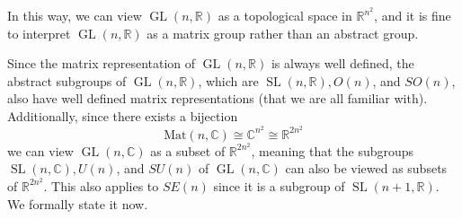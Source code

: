 \documentclass{article}
\DeclareMathOperator{\GL}{GL}
\DeclareMathOperator{\SL}{SL}
\begin{document}
    In this way, we can view $\GL(n, \mathbb{R})$ as a topological space in $\mathbb{R}^{n^2}$, and it is fine to interpret $\GL(n, \mathbb{R})$ as a matrix group rather than an abstract group. 

    Since the matrix representation of $\GL(n, \mathbb{R})$ is always well defined, the abstract subgroups of $\GL(n, \mathbb{R})$, which are $\SL(n, \mathbb{R}), O(n)$, and $SO(n)$, also have well defined matrix representations (that we are all familiar with). Additionally, since there exists a bijection
    \begin{equation}
      \text{Mat}(n, \mathbb{C}) \cong \mathbb{C}^{n^2} \cong \mathbb{R}^{2 n^2}
    \end{equation}
    we can view $\GL(n, \mathbb{C})$ as a subset of $\mathbb{R}^{2n^2}$, meaning that the subgroups $\SL(n, \mathbb{C}), U(n)$, and $SU(n)$ of $\GL(n, \mathbb{C})$ can also be viewed as subsets of $\mathbb{R}^{2n^2}$. This also applies to $SE(n)$ since it is a subgroup of $\SL(n+1, \mathbb{R})$. We formally state it now. 
\end{document}
